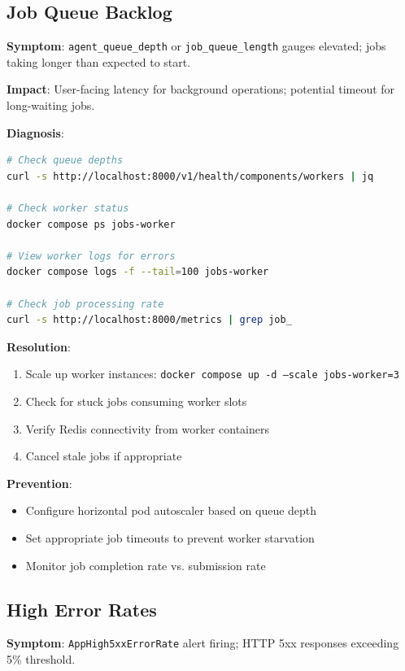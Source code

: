 \subsection{Job Queue Backlog}

\textbf{Symptom}: \texttt{agent\_queue\_depth} or \texttt{job\_queue\_length} gauges elevated; jobs taking longer than expected to start.

\textbf{Impact}: User-facing latency for background operations; potential timeout for long-waiting jobs.

\textbf{Diagnosis}:
\begin{lstlisting}[language=bash, caption={Job queue diagnostic commands}]
# Check queue depths
curl -s http://localhost:8000/v1/health/components/workers | jq

# Check worker status
docker compose ps jobs-worker

# View worker logs for errors
docker compose logs -f --tail=100 jobs-worker

# Check job processing rate
curl -s http://localhost:8000/metrics | grep job_
\end{lstlisting}

\textbf{Resolution}:
\begin{enumerate}
    \item Scale up worker instances: \texttt{docker compose up -d --scale jobs-worker=3}
    \item Check for stuck jobs consuming worker slots
    \item Verify Redis connectivity from worker containers
    \item Cancel stale jobs if appropriate
\end{enumerate}

\textbf{Prevention}:
\begin{itemize}
    \item Configure horizontal pod autoscaler based on queue depth
    \item Set appropriate job timeouts to prevent worker starvation
    \item Monitor job completion rate vs. submission rate
\end{itemize}

\subsection{High Error Rates}

\textbf{Symptom}: \texttt{AppHigh5xxErrorRate} alert firing; HTTP 5xx responses exceeding 5\% threshold.

